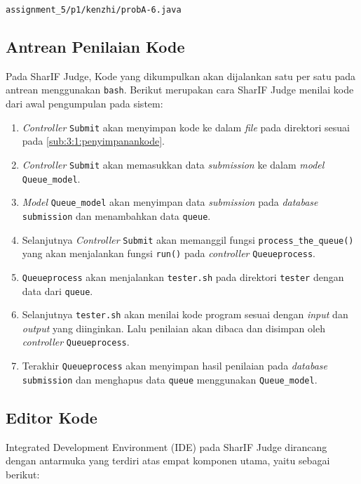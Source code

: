 \begin{center}
	\verb|assignment_5/p1/kenzhi/probA-6.java|
\end{center}

\subsection{Antrean Penilaian Kode}
\label{sub:3:1:antreanpenilaiankode}

Pada SharIF Judge, Kode yang dikumpulkan akan dijalankan satu per satu pada antrean menggunakan \verb|bash|. Berikut merupakan cara SharIF Judge menilai kode dari awal pengumpulan pada sistem:

\begin{enumerate}
	\item \textit{Controller} \verb|Submit| akan menyimpan kode ke dalam \textit{file} pada direktori sesuai pada \ref{sub:3:1:penyimpanankode}.
	\item \textit{Controller} \verb|Submit| akan memasukkan data \textit{submission} ke dalam \textit{model} \verb|Queue_model|.
	\item \textit{Model} \verb|Queue_model| akan menyimpan data \textit{submission} pada \textit{database} \verb|submission| dan menambahkan data \verb|queue|.
	\item Selanjutnya \textit{Controller} \verb|Submit| akan memanggil fungsi \verb|process_the_queue()| yang akan menjalankan fungsi \verb|run()| pada \textit{controller} \verb|Queueprocess|.
	\item \verb|Queueprocess| akan menjalankan \verb|tester.sh| pada direktori \verb|tester| dengan data dari \verb|queue|.
	\item Selanjutnya \verb|tester.sh| akan menilai kode program sesuai dengan \textit{input} dan \textit{output} yang diinginkan. Lalu penilaian akan dibaca dan disimpan oleh \textit{controller} \verb|Queueprocess|.
	\item Terakhir \verb|Queueprocess| akan menyimpan hasil penilaian pada \textit{database} \verb|submission| dan menghapus data \verb|queue| menggunakan \verb|Queue_model|.
\end{enumerate}

\subsection{Editor Kode}

Integrated Development Environment (IDE) pada SharIF Judge dirancang dengan antarmuka yang terdiri atas empat komponen utama, yaitu sebagai berikut:

